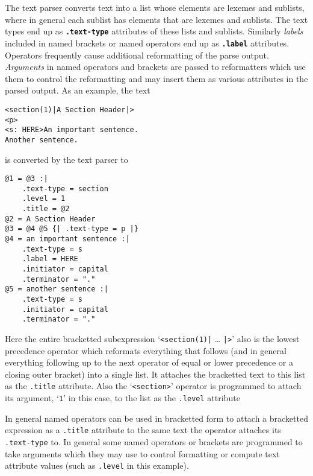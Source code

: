 \documentclass[12pt]{article}
\makeatletter
\newcommand{\ttdkey}[1]{{\tt \bf .#1}\index{#1@{\tt .#1}}}
\newenvironment{indpar}[1][0.3in]%
	{\begin{list}{}%
		     {\setlength{\itemsep}{0in}%
		      \setlength{\topsep}{0in}%
		      \setlength{\parsep}{1ex}%
		      \setlength{\labelwidth}{#1}%
		      \setlength{\leftmargin}{#1}%
		      \addtolength{\leftmargin}{\labelsep}}%
	 \item}%
	{\end{list}}
\makeatother
\begin{document}
The text parser converts text into a list whose elements are lexemes
and sublists, where in general each sublist has elements that are
lexemes and sublists.
The text types end up as \ttdkey{text-type}
attributes of these lists and sublists.
Similarly {\em labels} included in named brackets
or named operators end up as \ttdkey{label}
attributes.  Operators frequently cause additional reformatting
of the parse output.  {\em Arguments} in named operators and
brackets are passed to reformatters which use them to control
the reformatting and may insert them as various attributes in the
parsed output.  As an example, the text

\begin{indpar}\begin{verbatim}
<section(1)|A Section Header|>
<p>
<s: HERE>An important sentence.
Another sentence.
\end{verbatim}\end{indpar}

is converted by the text parser to

\begin{indpar}\begin{verbatim}
@1 = @3 :|
    .text-type = section
    .level = 1
    .title = @2
@2 = A Section Header
@3 = @4 @5 {| .text-type = p |}
@4 = an important sentence :|
    .text-type = s
    .label = HERE
    .initiator = capital 
    .terminator = "."
@5 = another sentence :|
    .text-type = s
    .initiator = capital 
    .terminator = "."
\end{verbatim}\end{indpar}

Here the entire bracketted subexpression
`\verb/<section(1)|/ \ldots{} \verb/|>/'
also is the lowest precedence operator which reformats everything that
follows (and in general everything following up to the next operator of
equal or lower precedence or a closing outer bracket) into a single list.
It attaches the bracketted text to this list as the {\tt .title} attribute.
Also the `\verb/<section>/' operator is programmed to attach its argument,
`\verb|1|' in this case, to the list as the {\tt .level} attribute

In general named operators can be used in bracketted form to attach
a bracketted expression as a {\tt .title} attribute to the same text
the operator attaches its {\tt .text-type} to.  In general some
named operators or brackets are programmed to take arguments which
they may use to control formatting or compute text attribute values
(such as {\tt .level} in this example).
\end{document}
